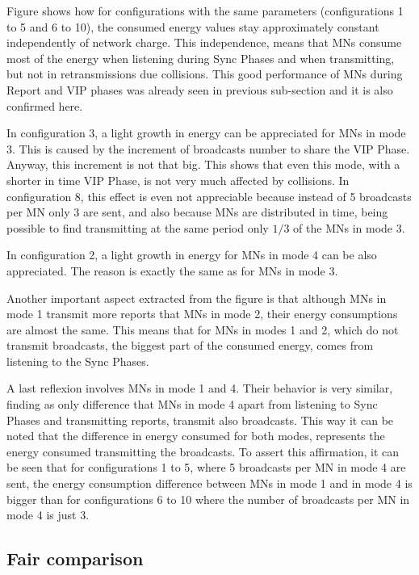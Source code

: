 Figure shows how for configurations with the same parameters (configurations 1 to 5 and 6 to 10), the consumed energy values stay approximately
constant independently of network charge. This independence, means that \acp{MN} consume most of the energy when listening during Sync Phases and 
when transmitting, but not in retransmissions due collisions. This good performance of \acp{MN} during Report and \ac{VIP} phases was already seen
in previous sub-section and it is also confirmed here. 

In configuration 3, a light growth in energy can be appreciated for \acp{MN} in mode 3. This is caused by the increment of broadcasts number to share the 
\ac{VIP} Phase. Anyway, this increment is not that big. This shows that even this mode, with a shorter in time \ac{VIP} Phase, is not very much affected
by collisions. In configuration 8, this effect is even not appreciable because instead of 5 broadcasts per \ac{MN} only 3 are sent, and also because
\acp{MN} are distributed in time, being possible to find transmitting at the same period only $1/3$ of the \acp{MN} in mode 3.

In configuration 2, a light growth in energy for \acp{MN} in mode 4 can be also appreciated. The reason is exactly the same as for \acp{MN} in mode 3.

Another important aspect extracted from the figure is that although \acp{MN} in mode 1 transmit more reports that \acp{MN} in mode 2, their energy
consumptions are almost the same. This means that for \acp{MN} in modes 1 and 2, which do not transmit broadcasts, the biggest part of the consumed energy,
comes from listening to the Sync Phases.

A last reflexion involves \acp{MN} in mode 1 and 4. Their behavior is very similar, finding as only difference that \acp{MN} in mode 4 apart from 
listening to Sync Phases and transmitting reports, transmit also broadcasts. This way it can be noted that the difference in energy consumed for both
modes, represents the energy consumed transmitting the broadcasts. To assert this affirmation, it can be seen that for configurations 1 to 5, where
5 broadcasts per \ac{MN} in mode 4 are sent, the energy consumption difference between \acp{MN} in mode 1 and in mode 4 is bigger than for configurations
6 to 10 where the number of broadcasts per \ac{MN} in mode 4 is just 3.

\subsection{Fair comparison}

